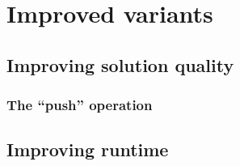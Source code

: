 \section{Improved variants}
\subsection{Improving solution quality}
\subsubsection{The \enquote{push} operation}

\subsection{Improving runtime}
